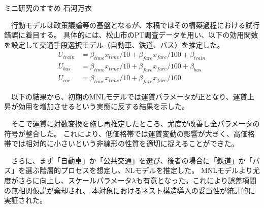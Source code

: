 \clearpage
\begin{column}{ミニ研究のすすめ}
    {\small 石河万衣}
    
　行動モデルは政策議論等の基盤となるが、本稿ではその構築過程における試行錯誤に着目する。
具体的には、松山市のPT調査データを用い、以下の効用関数を設定して交通手段選択モデル（自動車、鉄道、バス）を推定した。
\begin{align*}
U_{train} &= \beta_{time} x_{time} / 10 + \beta_{fare} x_{fare} / 100 + \beta_{train}\\
U_{bus} &= \beta_{time} x_{time} / 10 + \beta_{fare} x_{fare} / 100 + \beta_{bus}\\
U_{car} &= \beta_{time} x_{time} / 10 + \beta_{fare} x_{fare} / 100
\end{align*}

　以下の結果から、初期のMNLモデルでは運賃パラメータが正となり、運賃上昇が効用を増加させるという実態に反する結果を示した。

　そこで運賃に対数変換を施し再推定したところ、尤度が改善し全パラメータの符号が整合した。
これにより、低価格帯では運賃変動の影響が大きく、高価格帯では相対的に小さいという非線形の性質を適切に捉えることができた。

　さらに、まず「自動車」か「公共交通」を選び、後者の場合に「鉄道」か「バス」を選ぶ階層的プロセスを想定し、NLモデルを推定した。
MNLモデルより尤度がさらに向上し、スケールパラメータ$\lambda$も有意となった。これにより誤差項間の無相関仮説が棄却され、
本対象におけるネスト構造導入の妥当性が統計的に実証された。

\begin{center}
    \label{tab:integrated_model}
      
    \small
    \setlength{\tabcolsep}{3pt}


\end{center}
\end{column}
